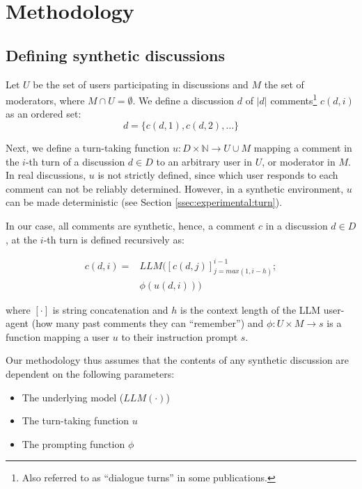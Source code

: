 %

\section{Methodology}
\label{sec:methodology}

\subsection{Defining synthetic discussions}
\label{ssec:methodology:discussions}

Let $U$ be the set of users participating in discussions and $M$ the set of moderators, where $M \cap U = \emptyset$. We define a discussion $d$ of $\lvert d \rvert$ comments\footnote{Also referred to as “dialogue turns” in some publications.} $c(d, i)$ as an ordered set:
\begin{equation}
    d = \{c(d, 1), c(d, 2), \ldots\}
\end{equation}


Next, we define a turn-taking function $u: D  \times \mathbb{N} \rightarrow U \cup M$ mapping a comment in the $i$-th turn of a discussion $d \in D$ to an arbitrary user in $U$, or moderator in $M$. In real discussions, $u$ is not strictly defined, since which user responds to each comment can not be reliably determined. However, in a synthetic environment, $u$ can be made deterministic (see Section \ref{ssec:experimental:turn}).

In our case, all comments are synthetic, hence, a comment $c$ in a discussion $d \in D$, at the $i$-th turn is defined recursively as:

\begin{equation}
\label{eq:comment}
\begin{split}
    c(d, i) = & LLM([c(d, j)]^{i-1}_{j=max(1, i-h)};\\
    &\phi(u(d, i)))
\end{split}
\end{equation}

\noindent where $[\cdot]$ is string concatenation and $h$ is the context length of the \ac{LLM} user-agent (how many past comments they can “remember”) and $\phi: U \times M \rightarrow s$ is a function mapping a user $u$ to their instruction prompt $s$.

Our methodology thus assumes that the contents of any synthetic discussion are dependent on the following parameters:
\begin{itemize}[noitemsep]
    \item The underlying model ($LLM(\cdot)$)
    \item The turn-taking function $u$
    \item The prompting function $\phi$
\end{itemize}


